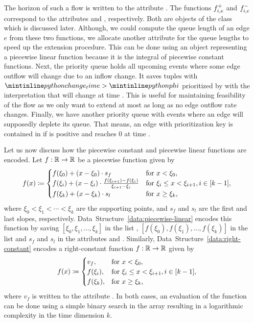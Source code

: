 The horizon of such a flow is written to the attribute .
The functions ${f}^+_{i,e}$ and ${f}^-_{i,e}$ correspond to the attributes  and , respectively.
Both are objects of the class  which is discussed later.
Although, we could compute the queue length of an edge $e$ from these two functions, we allocate 
another attribute  for the queue lengths to speed up the extension procedure.
This can be done using an object representing a piecewise linear function because it is the integral of piecewise constant functions.
Next, the priority queue  holds all upcoming events where some edge outflow will change due to an inflow change.
It saves tuples  with $\code{change_time} > \code{phi}$ prioritized by  with the interpretation that  will change at time .
This is useful for maintaining feasibility of the flow as we only want to extend at most as long as no edge outflow rate changes.
Finally, we have another priority queue  with events where an edge will supposedly deplete its queue.
That means, an edge  with prioritization key  is contained in  if  is positive and  reaches $0$ at time .

Let us now discuss how the piecewise constant and piecewise linear functions are encoded.
Let $f: \mathbb{R} \rightarrow \mathbb{R}$ be a piecewise function given by \[
    f(x) \coloneqq \begin{cases}
        f(\xi_0) +  (x - \xi_0) \cdot s_f & \text{for $x < \xi_0$,} \\
        f(\xi_i) + (x - \xi_i) \cdot \frac{f(\xi_{i+1}) - f(\xi_i)}{\xi_{i+1} - \xi_i} & \text{for $\xi_i \leq x < \xi_{i+1}, i \in [k-1]$},\\
        f(\xi_k) + (x - \xi_k)\cdot s_l & \text{for $x \geq \xi_k$,}
    \end{cases}
\]
where $\xi_0 < \xi_1 < \cdots < \xi_k$ are the supporting points, and $s_f$ and $s_l$ are the first and last slopes, respectively.
Data~Structure~\ref{data:piecewise-linear} encodes this function by saving $[\xi_0,\xi_1,\dots,\xi_k]$ in the list , $[f(\xi_0), f(\xi_1),\dots, f(\xi_k)]$ in the list  and $s_f$ and $s_l$ in the attributes  and .
Similarly, Data~Structure~\ref{data:right-constant} encodes a right-constant function $f:\mathbb{R} \rightarrow \mathbb{R}$ given by \[
    f(x) \coloneqq \begin{cases}
        v_f, & \text{for $x < \xi_0$,} \\
        f(\xi_i), & \text{for $\xi_i \leq x < \xi_{i+1}, i \in [k-1]$},\\
        f(\xi_k), & \text{for $x \geq \xi_k$,}
    \end{cases}
\]
where $v_f$ is written to the attribute .
In both cases, an evaluation of the function can be done using a simple binary search in the  array resulting in a logarithmic complexity in the time dimension $k$.

